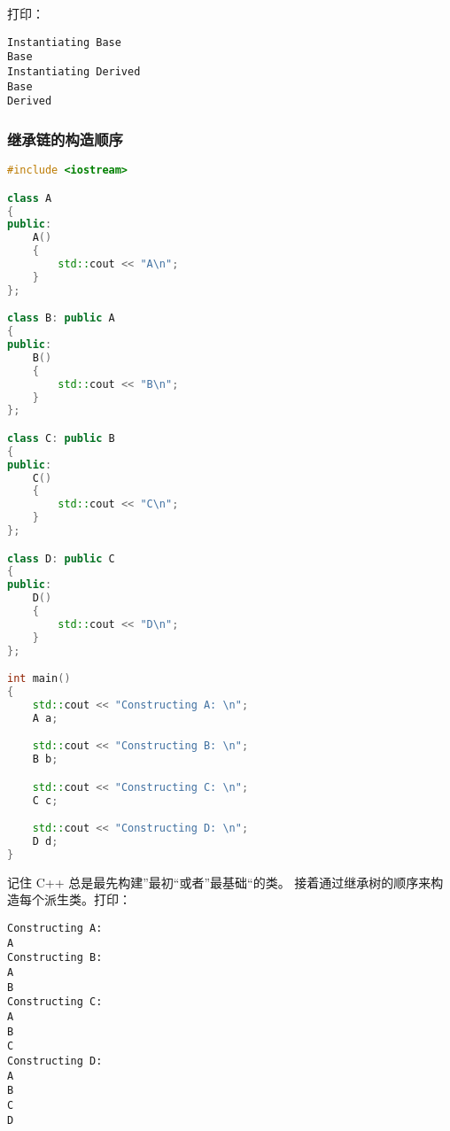 \documentclass[../../LearnCpp.tex]{subfiles}
\begin{document}
打印：

\begin{lstlisting}
Instantiating Base
Base
Instantiating Derived
Base
Derived
\end{lstlisting}

\subsubsection*{继承链的构造顺序}

\begin{lstlisting}[language=C++]
#include <iostream>

class A
{
public:
    A()
    {
        std::cout << "A\n";
    }
};

class B: public A
{
public:
    B()
    {
        std::cout << "B\n";
    }
};

class C: public B
{
public:
    C()
    {
        std::cout << "C\n";
    }
};

class D: public C
{
public:
    D()
    {
        std::cout << "D\n";
    }
};

int main()
{
    std::cout << "Constructing A: \n";
    A a;

    std::cout << "Constructing B: \n";
    B b;

    std::cout << "Constructing C: \n";
    C c;

    std::cout << "Constructing D: \n";
    D d;
}
\end{lstlisting}

记住 C++ 总是最先构建”最初“或者”最基础“的类。
接着通过继承树的顺序来构造每个派生类。打印：

\begin{lstlisting}
Constructing A:
A
Constructing B:
A
B
Constructing C:
A
B
C
Constructing D:
A
B
C
D
\end{lstlisting}
\end{document}
